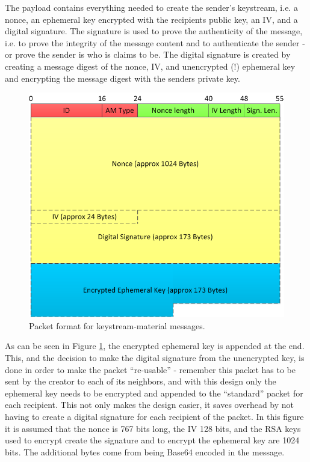 The payload contains everything needed to create the sender's keystream, i.e. a
nonce, an ephemeral key encrypted with the recipients public key, an IV, and a
digital signature. The signature is used to prove the authenticity of the
message, i.e. to prove the integrity of the message content and to authenticate
the sender - or prove the sender is who is claims to be. The digital signature
is created by creating a message digest of the nonce, IV, and unencrypted (!)
ephemeral key and encrypting the message digest with the senders private key.

\begin{figure}[h]
	\centering
  	\includegraphics[width=\textwidth]{images/keystream-material_message.png}
  	\caption{Packet format for keystream-material messages.}
	\label{fig:keystream-material_message}
\end{figure}

As can be seen in Figure \ref{fig:keystream-material_message}, the encrypted
ephemeral key is appended at the end. This, and the decision to make the
digital signature from the unencrypted key, is done in order to make the packet
``re-usable'' - remember this packet has to be sent by the creator to each of
its neighbors, and with this design only the ephemeral key needs to be
encrypted and appended to the ``standard'' packet for each recipient. This not
only makes the design easier, it saves overhead by not having to create a
digital signature for each recipient of the packet. In this figure it is assumed
that the nonce is 767 bits long, the IV 128 bits, and the RSA keys used to
encrypt create the signature and to encrypt the ephemeral key are 1024 bits. The
additional bytes come from being Base64 encoded in the message.

